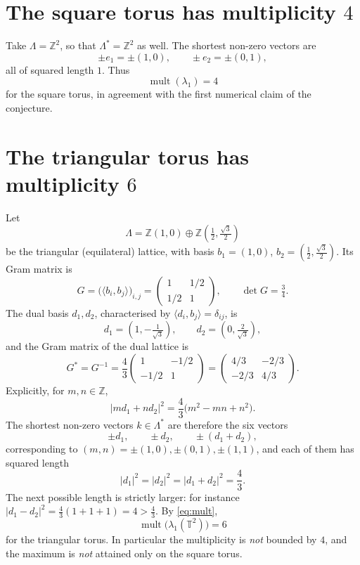 \documentclass[11pt]{article}
\theoremstyle{definition}
\newcommand{\Z}{\mathbb{Z}}
\newcommand{\T}{\mathbb{T}}
\newcommand{\Lam}{\Lambda}
\newcommand{\inner}[2]{\langle #1, #2\rangle}
\begin{document}
\section{The square torus has multiplicity $4$}

Take $\Lam = \Z^2$, so that $\Lam^{*} = \Z^2$ as well.  The shortest
non-zero vectors are
\[
  \pm e_1 = \pm(1,0), \qquad \pm e_2 = \pm(0,1),
\]
all of squared length $1$.  Thus
\[
  \operatorname{mult}(\lambda_1) = 4
\]
for the square torus, in agreement with the first numerical claim of the
conjecture.

\section{The triangular torus has multiplicity $6$}\label{sec:tri}

Let
\[
  \Lam = \Z(1,0) \oplus \Z\!\left(\tfrac12, \tfrac{\sqrt{3}}{2}\right)
\]
be the triangular (equilateral) lattice, with basis
$b_1 = (1,0)$, $b_2 = (\tfrac12, \tfrac{\sqrt3}{2})$.  Its Gram matrix is
\[
  G = \bigl(\inner{b_i}{b_j}\bigr)_{i,j}
    = \begin{pmatrix} 1 & 1/2 \\ 1/2 & 1 \end{pmatrix},
  \qquad \det G = \tfrac34 .
\]
The dual basis $d_1, d_2$, characterised by $\inner{d_i}{b_j} = \delta_{ij}$,
is
\[
  d_1 = \left(1, -\tfrac{1}{\sqrt3}\right), \qquad
  d_2 = \left(0, \tfrac{2}{\sqrt3}\right),
\]
and the Gram matrix of the dual lattice is
\[
  G^{*} = G^{-1}
        = \frac{4}{3}
          \begin{pmatrix} 1 & -1/2 \\ -1/2 & 1 \end{pmatrix}
        = \begin{pmatrix} 4/3 & -2/3 \\ -2/3 & 4/3 \end{pmatrix}.
\]
Explicitly, for $m,n \in \Z$,
\[
  |m d_1 + n d_2|^2
  = \frac{4}{3}\bigl(m^2 - mn + n^2\bigr).
\]
The shortest non-zero vectors $k \in \Lam^{*}$ are therefore the six vectors
\[
  \pm d_1, \qquad \pm d_2, \qquad \pm(d_1 + d_2),
\]
corresponding to $(m,n) = \pm(1,0), \pm(0,1), \pm(1,1)$, and each of them has
squared length
\[
  |d_1|^2 = |d_2|^2 = |d_1+d_2|^2 = \frac{4}{3}.
\]
The next possible length is strictly larger: for instance
$|d_1 - d_2|^2 = \frac43(1 + 1 + 1) = 4 > \frac43$.  By
\eqref{eq:mult},
\[
  \operatorname{mult}\bigl(\lambda_1(\T^2)\bigr) = 6
\]
for the triangular torus.  In particular the multiplicity is \emph{not}
bounded by $4$, and the maximum is \emph{not} attained only on the square
torus.
\end{document}
